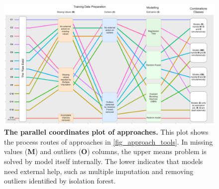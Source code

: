 \begin{figure}[ht]
\begin{center}
\includegraphics[scale=0.16]{./images/approach_parcoord_map}
\caption{{\bf The parallel coordinates plot of approaches.} This plot shows the process routes of approaches in \autoref{fig_approach_tools}. In missing values (\textbf{M}) and outliers (\textbf{O}) columns, the upper means problem is solved by model itself internally. The lower indicates that models need external help, such as multiple imputation and removing outliers identified by isolation forest.\setlength{\baselineskip}{1.25em}}
\label{fig_approach_parcoord}
\end{center}
\end{figure}